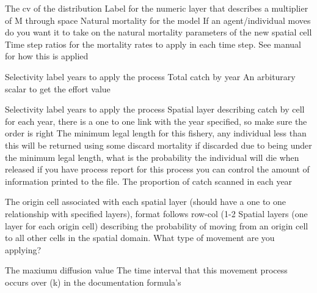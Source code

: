  {The cv of the distribution}
 {Label for the numeric layer that describes a multiplier of M through space}
 {Natural mortality for the model}
 {If an agent/individual moves do you want it to take on the natural mortality parameters of the new spatial cell}
 {Time step ratios for the mortality rates to apply in each time step. See manual for how this is applied}
\par\textbf{}\par
{} {Selectivity label}
 {years to apply the process}
 {Total catch by year}
 {An arbiturary scalar to get the effort value}
\par\textbf{}\par
{} {Selectivity label}
 {years to apply the process}
 {Spatial layer describing catch by cell for each year, there is a one to one link with the year specified, so make sure the order is right}
 {The minimum legal length for this fishery, any individual less than this will be returned using some discard mortality}
 {if discarded due to being under the minimum legal length, what is the probability the individual will die when released}
 {if you have process report for this process you can control the amount of information printed to the file.}
 {The proportion of catch scanned in each year}
\par\textbf{}\par
{} {The origin cell associated with each spatial layer (should have a one to one relationship with specified layers), format follows row-col (1-2}
 {Spatial layers (one layer for each origin cell) describing the probability of moving from an origin cell to all other cells in the spatial domain.}
 {What type of movement are you applying?}
\par\textbf{}\par
{} {The maxiumu diffusion value}
 {The time interval that this movement process occurs over (k) in the documentation formula's}
